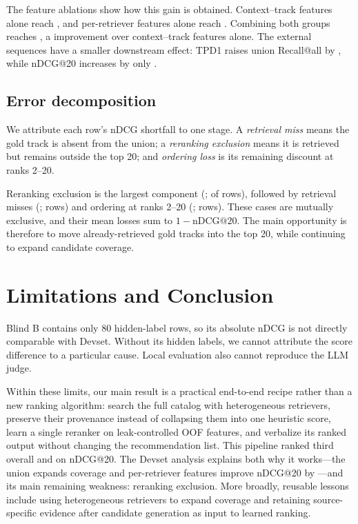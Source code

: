 \documentclass[sigconf]{acmart}
\begin{document}
The feature ablations show how this gain is obtained.  Context--track features
alone reach \DevNoProvTwenty, and per-retriever features alone reach
\DevProvOnlyTwenty.  Combining both groups reaches \DevFullTwenty, a
\DevPerRetrieverFeatureGain{} improvement over context--track features alone.
The external sequences have a smaller downstream effect: TPD1 raises union
Recall@all by \DevTpdRecallGain, while nDCG@20 increases by only
\DevTpdNDCGGain.

\subsection{Error decomposition}
We attribute each row's nDCG shortfall to one stage.  A \emph{retrieval miss}
means the gold track is absent from the union; a \emph{reranking exclusion}
means it is retrieved but remains outside the top 20; and \emph{ordering loss}
is its remaining discount at ranks 2--20.

Reranking exclusion is the largest component
(\RerankMissLoss; \RerankMissRows{} of \LocalEvaluationRows{} rows), followed
by retrieval misses (\RetrievalMissLoss; \RetrievalMissRows{} rows) and
ordering at ranks 2--20 (\OrderingLoss; \OrderingLossRows{} rows).  These
cases are mutually exclusive, and their mean losses sum to
$1-\mathrm{nDCG@20}$.  The main opportunity is therefore to move
already-retrieved gold tracks into the top 20, while continuing to expand
candidate coverage.

\section{Limitations and Conclusion}
Blind B contains only 80 hidden-label rows, so its absolute nDCG is not directly
comparable with Devset.  Without its hidden labels, we cannot attribute the
score difference to a particular cause.  Local evaluation also cannot
reproduce the LLM judge.

Within these limits, our main result is a practical end-to-end recipe rather
than a new ranking algorithm: search the full catalog with heterogeneous
retrievers, preserve their provenance instead of collapsing them into one
heuristic score, learn a single reranker on leak-controlled OOF features, and
verbalize its ranked output without changing the recommendation list.  This
pipeline ranked third overall and on nDCG@20.  The Devset analysis explains both
why it works---the union expands coverage and per-retriever features improve
nDCG@20 by \DevPerRetrieverFeatureGain---and its main remaining weakness:
reranking exclusion.  More broadly, reusable lessons include using
heterogeneous retrievers to expand coverage and retaining source-specific
evidence after candidate generation as input to learned ranking.

\clearpage


\end{document}
